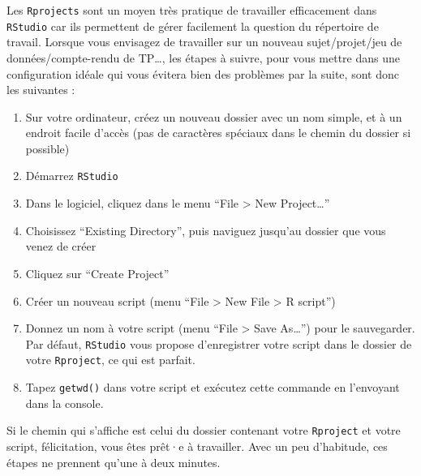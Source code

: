 \documentclass[
  a4paper,
  DIV=11,
  numbers=noendperiod,
  oneside]{scrreprt}
\providecommand{\tightlist}{%
  \setlength{\itemsep}{0pt}\setlength{\parskip}{0pt}}\usepackage{longtable,booktabs,array}
\begin{document}
\begin{tcolorbox}[enhanced jigsaw, coltitle=black, toprule=.15mm, opacityback=0, breakable, colback=white, opacitybacktitle=0.6, colframe=quarto-callout-important-color-frame, leftrule=.75mm, rightrule=.15mm, titlerule=0mm, bottomtitle=1mm, toptitle=1mm, arc=.35mm, title=\textcolor{quarto-callout-important-color}{\faExclamation}\hspace{0.5em}{Pour résumer\ldots{} \faIcon{laptop-code}}, colbacktitle=quarto-callout-important-color!10!white, bottomrule=.15mm, left=2mm]

Les \texttt{Rprojects} sont un moyen très pratique de travailler
efficacement dans \texttt{RStudio} car ils permettent de gérer
facilement la question du répertoire de travail. Lorsque vous envisagez
de travailler sur un nouveau sujet/projet/jeu de données/compte-rendu de
TP\ldots, les étapes à suivre, pour vous mettre dans une configuration
idéale qui vous évitera bien des problèmes par la suite, sont donc les
suivantes :

\begin{enumerate}
\def\labelenumi{\arabic{enumi}.}
\tightlist
\item
  Sur votre ordinateur, créez un nouveau dossier avec un nom simple, et
  à un endroit facile d'accès (pas de caractères spéciaux dans le chemin
  du dossier si possible)
\item
  Démarrez \texttt{RStudio}
\item
  Dans le logiciel, cliquez dans le menu ``File \textgreater{} New
  Project\ldots{}''
\item
  Choisissez ``Existing Directory'', puis naviguez jusqu'au dossier que
  vous venez de créer
\item
  Cliquez sur ``Create Project''
\item
  Créer un nouveau script (menu ``File \textgreater{} New File
  \textgreater{} R script'')
\item
  Donnez un nom à votre script (menu ``File \textgreater{} Save
  As\ldots{}'') pour le sauvegarder. Par défaut, \texttt{RStudio} vous
  propose d'enregistrer votre script dans le dossier de votre
  \texttt{Rproject}, ce qui est parfait.
\item
  Tapez \texttt{getwd()} dans votre script et exécutez cette commande en
  l'envoyant dans la console.
\end{enumerate}

Si le chemin qui s'affiche est celui du dossier contenant votre
\texttt{Rproject} et votre script, félicitation, vous êtes prêt·e à
travailler. Avec un peu d'habitude, ces étapes ne prennent qu'une à deux
minutes.

\end{tcolorbox}
\end{document}
